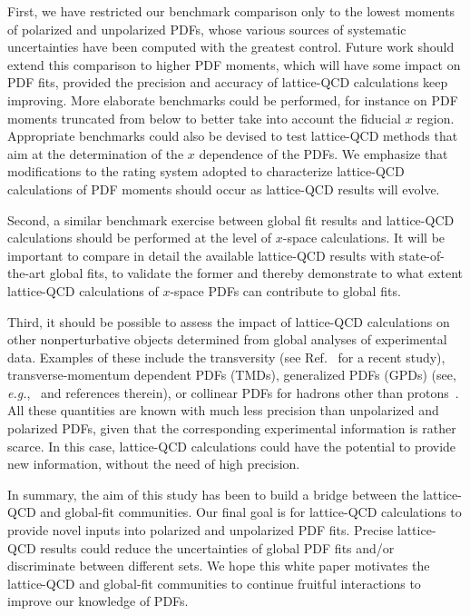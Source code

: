 First, we have restricted our benchmark comparison only to the lowest moments 
of polarized and unpolarized PDFs, whose various sources of systematic 
uncertainties have been computed with the greatest control.
%
Future work should extend this comparison to higher PDF moments,
which will have some impact on PDF fits, provided the precision and accuracy
of lattice-QCD calculations keep improving.
%
More elaborate benchmarks could be performed, for instance on PDF moments
truncated from below to better take into account the fiducial $x$ region.
%
Appropriate benchmarks could also be devised to test lattice-QCD methods
that aim at the determination of the $x$ dependence of the PDFs.
%
We emphasize that modifications to the rating system adopted to
characterize lattice-QCD calculations of PDF moments should occur 
as lattice-QCD results will evolve.

Second, a similar benchmark exercise between global fit results and 
lattice-QCD calculations should be performed at the level of
$x$-space calculations.
%
It will be important to compare in detail the available lattice-QCD results 
with state-of-the-art global fits, to validate the former and
thereby demonstrate to what extent lattice-QCD calculations of $x$-space PDFs 
can contribute to global fits.

Third, it should be possible to assess the impact of lattice-QCD 
calculations on other nonperturbative objects
determined from global analyses of experimental data.
%
Examples of these include the transversity (see Ref.~\cite{Lin:2017stx}
for a recent study), transverse-momentum dependent 
PDFs (TMDs), generalized PDFs (GPDs) (see, {\it e.g.},~\cite{Angeles-Martinez:2015sea,Musch:2011er,Engelhardt:2015xja,Yoon:2017qzo} and references therein), 
or collinear PDFs for hadrons other than 
protons~\cite{Sutton:1991ay,Burkardt:2001jg}.
%
All these quantities are known with much less precision than unpolarized
and polarized PDFs, given that the corresponding experimental information
is rather scarce. 
%
In this case, lattice-QCD calculations could have the potential
to provide new information, without the need of high precision.

In summary, the aim of this study has been to build a bridge between the 
lattice-QCD and global-fit communities.
%
Our final goal is for lattice-QCD calculations to provide novel inputs into 
polarized and unpolarized PDF fits. 
%
Precise lattice-QCD results could reduce the uncertainties of
global PDF fits and/or discriminate between different sets.
%
We hope this white paper motivates the lattice-QCD and global-fit
communities to continue fruitful interactions to improve our knowledge of PDFs.
